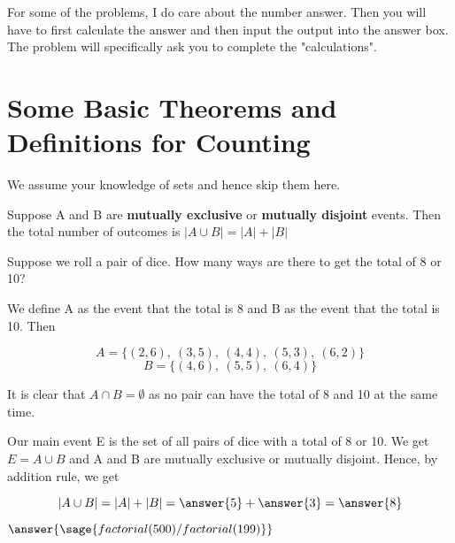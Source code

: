 \documentclass{ximera}
\begin{document}
\hspace{1cm}

For some of the problems, I do care about the number answer. Then you will have to first calculate the answer and then input the output into the answer box. The problem will specifically ask you to complete the "calculations".

\section*{Some Basic Theorems and Definitions for Counting}

We assume your knowledge of sets and hence skip them here.

\begin{theorem}
Suppose A and B are \textbf{mutually exclusive} or \textbf{mutually disjoint}  events. Then the total number of outcomes is $|A\cup B|=|A|+|B|$
\end{theorem}

\begin{example}
Suppose we roll a pair of dice. How many ways are there to get the total of 8 or 10?

\begin{explanation}
We define A as the event that the total is 8 and B as the event that the total is 10. Then 

$$A=\{(2,6),~(3,5),~(4,4),~(5,3),~(6,2)\}$$
$$B=\{(4,6),~(5,5),~(6,4)\}$$

It is clear that $A\cap B=\emptyset$ as no pair can have the total of 8 and 10 at the same time.

Our main event E is the set of all pairs of dice with a total of 8 or 10. We get $E=A\cup B$ and A and B are mutually exclusive or mutually disjoint. Hence, by addition rule, we get

$$|A\cup B|=|A|+|B|=\answer{5}+\answer{3}=\answer{8}$$


\end{explanation}
\end{example}





\begin{problem}
$\answer{\sage{factorial(500)/factorial(199)}}$
\end{problem}
\end{document}
